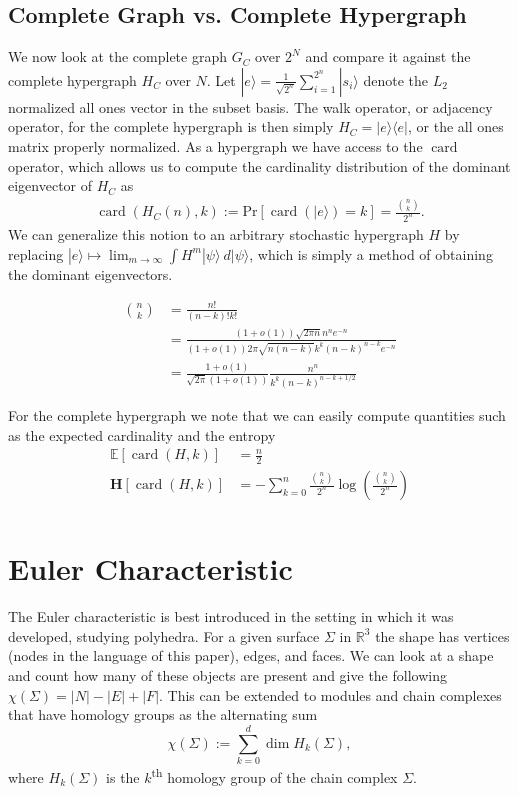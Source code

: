 \documentclass{article}
\newcommand{\ket}[1]{|#1\rangle}
\newcommand{\ketbra}[2]{| #1\rangle\! \langle #2|}
\newcommand{\parens}[1]{\left( #1 \right)}
\newcommand{\brackets}[1]{\left[ #1 \right]}
\newcommand{\expect}[1]{\mathbb{E}\brackets{#1}}
\newcommand{\prob}[1]{\text{Pr}\left[ #1 \right]}
\newcommand{\ts}{\textsuperscript}
\DeclareMathOperator{\card}{card}
\newcommand{\cardi}[1]{\card \parens{ #1 }}
\begin{document}
\subsection{Complete Graph vs. Complete Hypergraph}
We now look at the complete graph $G_C$ over $2^N$ and compare it against the complete hypergraph $H_C$ over $N$. Let $\ket{e} = \frac{1}{\sqrt{2^n}} \sum_{i=1}^{2^n} \ket{s_i}$ denote the $L_2$ normalized all ones vector in the subset basis. The walk operator, or adjacency operator, for the complete hypergraph is then simply $H_C = \ketbra{e}{e}$, or the all ones matrix properly normalized. As a hypergraph we have access to the $\card$ operator, which allows us to compute the cardinality distribution of the dominant eigenvector of $H_C$ as
\begin{align}
    \cardi{H_C(n), k} := \prob{\cardi{\ket{e}} = k } = \frac{\binom{n}{k}}{2^n}.
\end{align}
We can generalize this notion to an arbitrary stochastic hypergraph $H$  by replacing $\ket{e} \mapsto \lim_{m \to \infty} \int H^m \ket{\psi} ~d\ket{\psi} $, which is simply a method of obtaining the dominant eigenvectors.


\begin{align}
    \binom{n}{k} &= \frac{n!}{(n-k)! k!} \\
    &= \frac{(1 + o(1))\sqrt{2 \pi n} n^n e^{-n}}{(1+o(1)) 2 \pi \sqrt{n (n-k)} k^k (n-k)^{n-k} e^{-n}} \\
    &= \frac{1 + o(1)}{\sqrt{2 \pi}(1+o(1))} \frac{n^n}{ k^k (n-k)^{n-k + 1/2}}
\end{align}

For the complete hypergraph we note that we can easily compute quantities such as the expected cardinality and the entropy
\begin{align}
    \expect{\cardi{H, k}} &= \frac{n}{2} \\
    \mathbf{H} \brackets{\cardi{H, k}} &= - \sum_{k=0}^{n} \frac{\binom{n}{k}}{2^n} \log \parens{\frac{\binom{n}{k}}{2^n}}\\
\end{align}

\section{Euler Characteristic} \label{sec:euler_characteristic}
The Euler characteristic is best introduced in the setting in which it was developed, studying polyhedra. For a given surface $\Sigma$ in $\mathbb{R}^3$ the shape has vertices (nodes in the language of this paper), edges, and faces. We can look at a shape and count how many of these objects are present and give the following $\chi(\Sigma) = |N| - |E| + |F|$. This can be extended to modules and chain complexes that have homology groups as the alternating sum
\begin{equation}
    \chi(\Sigma) := \sum_{k = 0}^d \dim H_k(\Sigma),
\end{equation}
where $H_k(\Sigma)$ is the $k$\ts{th} homology group of the chain complex $\Sigma$.
\end{document}
